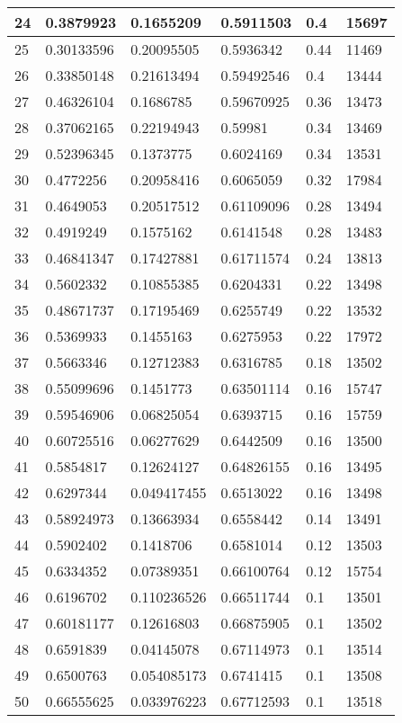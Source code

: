 \begin{longtable}{|l|l|l|l|l|l|}
24 & 0.3879923 & 0.1655209 & 0.5911503 & 0.4 & 15697 \\ \hline 
25 & 0.30133596 & 0.20095505 & 0.5936342 & 0.44 & 11469 \\ \hline 
26 & 0.33850148 & 0.21613494 & 0.59492546 & 0.4 & 13444 \\ \hline 
27 & 0.46326104 & 0.1686785 & 0.59670925 & 0.36 & 13473 \\ \hline 
28 & 0.37062165 & 0.22194943 & 0.59981 & 0.34 & 13469 \\ \hline 
29 & 0.52396345 & 0.1373775 & 0.6024169 & 0.34 & 13531 \\ \hline 
30 & 0.4772256 & 0.20958416 & 0.6065059 & 0.32 & 17984 \\ \hline 
31 & 0.4649053 & 0.20517512 & 0.61109096 & 0.28 & 13494 \\ \hline 
32 & 0.4919249 & 0.1575162 & 0.6141548 & 0.28 & 13483 \\ \hline 
33 & 0.46841347 & 0.17427881 & 0.61711574 & 0.24 & 13813 \\ \hline 
34 & 0.5602332 & 0.10855385 & 0.6204331 & 0.22 & 13498 \\ \hline 
35 & 0.48671737 & 0.17195469 & 0.6255749 & 0.22 & 13532 \\ \hline 
36 & 0.5369933 & 0.1455163 & 0.6275953 & 0.22 & 17972 \\ \hline 
37 & 0.5663346 & 0.12712383 & 0.6316785 & 0.18 & 13502 \\ \hline 
38 & 0.55099696 & 0.1451773 & 0.63501114 & 0.16 & 15747 \\ \hline 
39 & 0.59546906 & 0.06825054 & 0.6393715 & 0.16 & 15759 \\ \hline 
40 & 0.60725516 & 0.06277629 & 0.6442509 & 0.16 & 13500 \\ \hline 
41 & 0.5854817 & 0.12624127 & 0.64826155 & 0.16 & 13495 \\ \hline 
42 & 0.6297344 & 0.049417455 & 0.6513022 & 0.16 & 13498 \\ \hline 
43 & 0.58924973 & 0.13663934 & 0.6558442 & 0.14 & 13491 \\ \hline 
44 & 0.5902402 & 0.1418706 & 0.6581014 & 0.12 & 13503 \\ \hline 
45 & 0.6334352 & 0.07389351 & 0.66100764 & 0.12 & 15754 \\ \hline 
46 & 0.6196702 & 0.110236526 & 0.66511744 & 0.1 & 13501 \\ \hline 
47 & 0.60181177 & 0.12616803 & 0.66875905 & 0.1 & 13502 \\ \hline 
48 & 0.6591839 & 0.04145078 & 0.67114973 & 0.1 & 13514 \\ \hline 
49 & 0.6500763 & 0.054085173 & 0.6741415 & 0.1 & 13508 \\ \hline 
50 & 0.66555625 & 0.033976223 & 0.67712593 & 0.1 & 13518 \\ \hline 
\end{longtable}